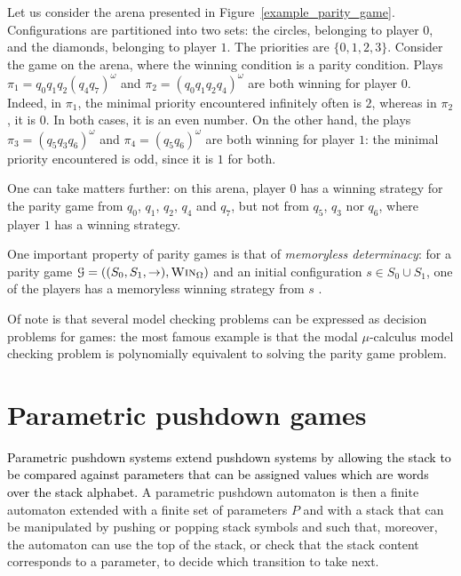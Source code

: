 \documentclass[a4paper,UKenglish,cleveref, autoref, thm-restate]{lipics-v2021}
\newcommand\mh[1]{\todo[inline,size=\scriptsize]{#1 - \textbf{Mathieu}}}
\newcommand{\win}{\textsc{Win}}
\begin{document}
\begin{example}
Let us consider the arena presented in  Figure~\ref{example_parity_game}. 
Configurations are partitioned into two sets: the circles, belonging to player $0$, and the diamonds,
belonging to player $1$. 
The priorities are $\{ 0,1,2,3\}$.
Consider the game on the arena, where the winning condition is a parity condition.
Plays $\pi_1 = q_0 q_1 q_2 (q_4 q_7)^\omega$ and 
$\pi_2 = (q_0 q_1 q_2 q_4)^\omega$ are both winning for player $0$. Indeed, in $\pi_1$, 
the minimal priority encountered infinitely often is %
				$2$, 
whereas in $\pi_2$, it is %
			$0$. 
In both cases, it is an even number. On the other hand,
the plays $\pi_3 = (q_5 q_3 q_6)^\omega$ and $\pi_4=(q_5 q_6)^\omega$ are both winning for player $1$: the minimal priority encountered is odd, since it is $1$ for both.

One can take matters further: on this arena, player $0$ has a winning strategy for the parity game from $q_0$, $q_1$, $q_2$, $q_4$ and $q_7$, but not from $q_5$, $q_3$ nor $q_6$, where player $1$ has a winning strategy. 
\end{example}



One important property of parity games is that of {\em memoryless determinacy}: for a parity game
$\mathcal{G}= ((S_0,S_1,\rightarrow),\win_\Omega) $ and an initial configuration $s \in S_0 \cup S_1$, one of the players has a memoryless winning strategy from $s$ \cite{zielonka1998infinite}.

Of note is that several model checking problems %
can be expressed as decision problems for games: the most famous example is that the modal $\mu$-calculus model checking problem is polynomially equivalent to solving the parity game problem. 


\section{Parametric pushdown games}





\textcolor{black}{Parametric pushdown systems extend pushdown systems by allowing the stack to be compared against parameters that can be assigned values which are words over the stack alphabet.}
A parametric pushdown automaton is then a finite automaton extended with a finite set of parameters $P$  and with a stack that can be manipulated by pushing or popping stack symbols and such that, moreover, the automaton can use the top of the stack, or check that the stack content corresponds to a parameter,  to decide which transition to take next.\\
\end{document}
